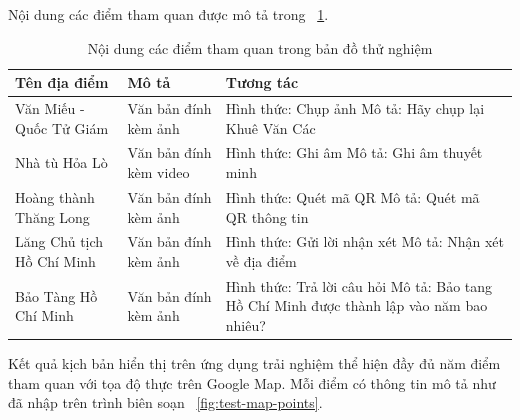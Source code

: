 Nội dung các điểm tham quan được mô tả trong \tablename~\ref{tab:test-map-content}.
\begin{table}[h]
\centering
\caption{Nội dung các điểm tham quan trong bản đồ thử nghiệm}
\label{tab:test-map-content}
\begin{tabular}{|p{3cm}|p{6cm}|p{5cm}|}
\hline
\textbf{Tên địa điểm} & \textbf{Mô tả} & \textbf{Tương tác} \\ \hline
Văn Miếu - Quốc
Tử Giám
&Văn bản đính
kèm ảnh
&Hình thức: Chụp ảnh \newline
Mô tả: Hãy chụp lại Khuê Văn Các \\ \hline
Nhà tù Hỏa Lò
&Văn bản đính
kèm video
&Hình thức: Ghi âm \newline
Mô tả: Ghi âm thuyết minh \\ \hline
Hoàng thành
Thăng Long
&Văn bản đính
kèm ảnh
&Hình thức: Quét mã QR \newline
Mô tả: Quét mã QR thông tin \\ \hline
Lăng Chủ tịch
Hồ Chí Minh
&Văn bản đính
kèm ảnh
&Hình thức: Gửi lời nhận xét \newline
Mô tả: Nhận xét về địa điểm \\ \hline
Bảo Tàng
Hồ Chí Minh
& Văn bản đính
kèm ảnh
&Hình thức: Trả lời câu hỏi \newline
Mô tả: Bảo tang Hồ Chí Minh được thành lập vào năm bao nhiêu? \\ \hline
\end{tabular}
\end{table}
\newpage
Kết quả kịch bản hiển thị trên ứng dụng trải nghiệm thể hiện đầy đủ năm điểm tham
quan với tọa độ thực trên Google Map. Mỗi điểm có thông tin mô tả như đã nhập
trên trình biên soạn \figurename~\ref{fig:test-map-points}. 

